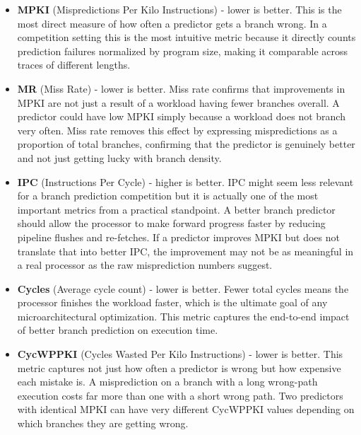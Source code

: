 \documentclass[11pt,a4paper]{article}
\begin{document}
\begin{itemize}
    \item \textbf{MPKI} (Mispredictions Per Kilo Instructions) - lower is better. 
    This is the most direct measure of how often a predictor gets a branch wrong. 
    In a competition setting this is the most intuitive metric because it directly 
    counts prediction failures normalized by program size, making it comparable 
    across traces of different lengths.

    \item \textbf{MR} (Miss Rate) - lower is better. Miss rate confirms that 
    improvements in MPKI are not just a result of a workload having fewer branches 
    overall. A predictor could have low MPKI simply because a workload does not 
    branch very often. Miss rate removes this effect by expressing mispredictions 
    as a proportion of total branches, confirming that the predictor is genuinely 
    better and not just getting lucky with branch density.

    \item \textbf{IPC} (Instructions Per Cycle) - higher is better. IPC might 
    seem less relevant for a branch prediction competition but it is actually one 
    of the most important metrics from a practical standpoint. A better branch 
    predictor should allow the processor to make forward progress faster by 
    reducing pipeline flushes and re-fetches. If a predictor improves MPKI but 
    does not translate that into better IPC, the improvement may not be as 
    meaningful in a real processor as the raw misprediction numbers suggest.

    \item \textbf{Cycles} (Average cycle count) - lower is better. Fewer total 
    cycles means the processor finishes the workload faster, which is the 
    ultimate goal of any microarchitectural optimization. This metric captures 
    the end-to-end impact of better branch prediction on execution time.

    \item \textbf{CycWPPKI} (Cycles Wasted Per Kilo Instructions) - lower is 
    better. This metric captures not just how often a predictor is wrong but how 
    expensive each mistake is. A misprediction on a branch with a long wrong-path 
    execution costs far more than one with a short wrong path. Two predictors with 
    identical MPKI can have very different CycWPPKI values depending on which 
    branches they are getting wrong.
\end{itemize}
\end{document}

